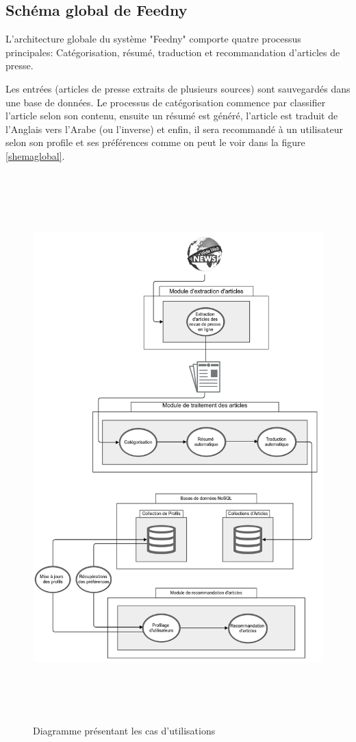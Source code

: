 \subsection{Schéma global de \textquotedbl Feedny\textquotedbl}
L'architecture globale du système "Feedny" comporte quatre processus principales: Catégorisation, résumé, traduction et recommandation d'articles de presse.

Les entrées (articles de presse extraits de plusieurs sources) sont sauvegardés dans une base de données. Le processus de catégorisation commence par classifier l'article selon son contenu, ensuite un résumé est généré, l'article est traduit de l'Anglais vers l'Arabe (ou l'inverse) et enfin, il sera recommandé à un utilisateur selon son profile et ses préférences comme on peut le voir dans la figure \ref{shemaglobal}.

\begin{figure}[H]
    \centering
    \includegraphics[height=600pt,width=450pt]{img/chapter3/global.png}
    \caption{Diagramme présentant les cas d'utilisations}
\end{figure}

